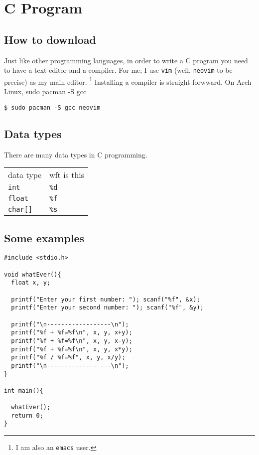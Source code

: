 



\chapter{C Program}
\section{How to download}
Just like other programming languages, in order to write a C program you
need to have a text editor and a compiler. For me, I use \verb|vim| 
(well, \verb|neovim| to be precise) as my main editor.
\footnote{I am also an \texttt{emacs} user.}
Installing a compiler is straight forwward. On Arch Linux, 
sudo pacman -S gcc
\begin{verbatim}
$ sudo pacman -S gcc neovim
\end{verbatim}
\section{Data types}
There are many data types in C programming.
\begin{center}
  \begin{tabular}{ll}
    \toprule
    data type      & wft is this\\
    \cmidrule(r){1-1} \cmidrule(r){2-2}
    \verb|int|     &   \verb|%d|\\
    \verb|float|   &   \verb|%f|\\
    \verb|char[]|  &   \verb|%s|\\
    \bottomrule
  \end{tabular}
\end{center}
\newpage
\section{Some examples}
\begin{lstlisting}[language=cmeng]
#include <stdio.h>

void whatEver(){
  float x, y;

  printf("Enter your first number: "); scanf("%f", &x);
  printf("Enter your second number: "); scanf("%f", &y);

  printf("\n------------------\n");
  printf("%f + %f=%f\n", x, y, x+y);
  printf("%f + %f=%f\n", x, y, x-y);
  printf("%f + %f=%f\n", x, y, x*y);
  printf("%f / %f=%f", x, y, x/y);
  printf("\n------------------\n");
}

int main(){

  whatEver();
  return 0;
}

\end{lstlisting}



